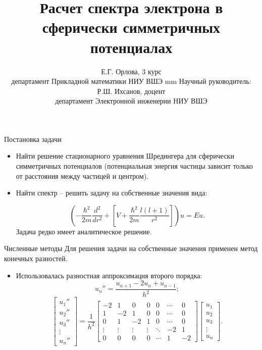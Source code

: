 \documentclass{beamer}
\author[Елена Орлова]{Е.Г. Орлова, 3 курс\\
департамент Прикладной математики НИУ ВШЭ \vskip 2 mm
Научный руководитель: Р.Ш. Ихсанов, доцент\\
департамент Электронной инженерии НИУ ВШЭ}
\title[Расчет спектра электрона]{Расчет спектра электрона в сферически симметричных потенциалах}
\begin{document}
\begin{frame}
  \titlepage
\end{frame}

\begin{frame}{Постановка задачи}

	\begin{itemize}
        \item Найти решение стационарного уравнения Шредингера для сферически симметричных потенциалов (потенциальная энергия частицы зависит только от расстояния между частицей и центром).
        \item Найти спектр – решить задачу на собственные значения вида:
       
         $$(-\frac{\hbar^2}{2m}\frac{d^2 }{d r^2}+[V+\frac{\hbar^2}{2m}\frac{l(l+1)}{r^2}])u = Eu.$$
         Задача редко имеет аналитическое решение.
       
	 \end{itemize}

\end{frame}


\begin{frame}{Численные методы}
Для решения задачи на собственные значения применен метод конечных разностей.
   \vskip 2mm
    \begin{itemize}
    		\item Использовалась разностная аппроксимация второго порядка:
    		$$\displaystyle{{u_n''} = \frac{u_{n+1}-2u_n +u_{n-1}}{h^2}};$$  
    		$$\begin{bmatrix}
u_1'' \\
u_2'' \\
u_3'' \\
\vdots \\
u_n''
\end{bmatrix} = \frac{1}{h^2} \begin{bmatrix}
-2 & 1 &0&0&0& \cdots & 0 \\
1 & -2 & 1& 0&0&\cdots & 0 \\  
0&1 & -2 & 1& 0&\cdots & 0 \\  
\vdots & \vdots &\vdots & \vdots & \ddots & -2& 1  \\
0 & 0&0 &0& \cdots &1 & -2
\end{bmatrix}
\begin{bmatrix}
u_1
\\
u_2
\\
u_3
\\
\vdots
\\
u_n
\end{bmatrix}. $$
  
   \end{itemize}
    
\end{frame}
\end{document}

